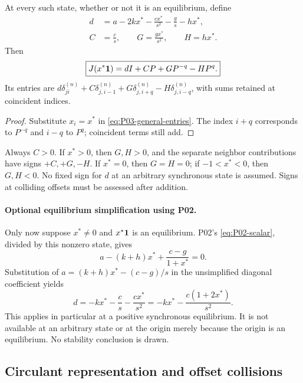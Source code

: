 \begin{proposition}
\label{prop:P03-homogeneous}
At every such state, whether or not it is an equilibrium, define
\begin{align}
 d&=a-2kx^*-\frac{c x^*}{s^2}-\frac{g}{s}-h x^*,
       \label{eq:P03-d}\\
 C&=\frac{c}{s},\qquad G=\frac{g x^*}{s^2},\qquad H=h x^*.
       \label{eq:P03-CGH}
\end{align}
Then
\begin{equation}
 \boxed{J(x^*\mathbf{1})=dI+CP+GP^{-q}-HP^q.}
 \label{eq:P03-homogeneous}
\end{equation}
Its entries are
$d\delta^{(n)}_{ji}+C\delta^{(n)}_{j,i-1}
+G\delta^{(n)}_{j,i+q}-H\delta^{(n)}_{j,i-q}$,
with sums retained at coincident indices.
\end{proposition}
\begin{proof}
Substitute $x_i=x^*$ in \eqref{eq:P03-general-entries}.
The index $i+q$ corresponds to $P^{-q}$ and $i-q$ to $P^q$;
coincident terms still add.
\end{proof}

Always $C>0$. If $x^*>0$, then $G,H>0$, and the separate
neighbor contributions have signs $+C,+G,-H$. If $x^*=0$,
then $G=H=0$; if $-1<x^*<0$, then $G,H<0$.
No fixed sign for $d$ at an arbitrary synchronous state is assumed.
Signs at colliding offsets must be assessed after addition.

\paragraph{Optional equilibrium simplification using P02.}
Only now suppose $x^*\ne0$ and $x^*\mathbf{1}$ is an equilibrium.
P02's \eqref{eq:P02-scalar}, divided by this nonzero state, gives
\begin{equation}
 a-(k+h)x^*+\frac{c-g}{1+x^*}=0.
 \label{eq:P03-equilibrium-relation}
\end{equation}
Substitution of $a=(k+h)x^*-(c-g)/s$ in the unsimplified
 diagonal coefficient yields
\begin{equation}
 d=-k x^*-\frac{c}{s}-\frac{c x^*}{s^2}
   =-k x^*-\frac{c(1+2x^*)}{s^2}.
 \label{eq:P03-equilibrium-d}
\end{equation}
This applies in particular at a positive synchronous equilibrium.
It is not available at an arbitrary state or at the origin merely
because the origin is an equilibrium. No stability conclusion is drawn.

\subsection{Circulant representation and offset collisions}

